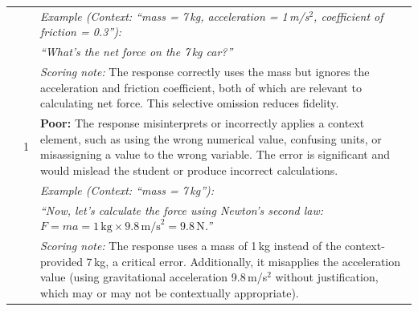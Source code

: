 \begin{longtable}{@{}p{3.5cm} p{2cm} p{8.5cm}@{}}
& & \textit{Example (Context: ``mass = 7\,kg, acceleration = 1\,m/s$^2$, coefficient of friction = 0.3''):} \\
& & \textit{``What's the net force on the 7\,kg car?''} \\
& & \textit{Scoring note:} The response correctly uses the mass but ignores the acceleration and friction coefficient, both of which are relevant to calculating net force. This selective omission reduces fidelity. \\
\addlinespace
& 1 & \textbf{Poor:} The response misinterprets or incorrectly applies a context element, such as using the wrong numerical value, confusing units, or misassigning a value to the wrong variable. The error is significant and would mislead the student or produce incorrect calculations. \\
& & \textit{Example (Context: ``mass = 7\,kg''):} \\
& & \textit{``Now, let's calculate the force using Newton's second law: $F = ma = 1\,\text{kg} \times 9.8\,\text{m/s}^2 = 9.8\,\text{N}$.''} \\
& & \textit{Scoring note:} The response uses a mass of 1\,kg instead of the context-provided 7\,kg, a critical error. Additionally, it misapplies the acceleration value (using gravitational acceleration 9.8\,m/s$^2$ without justification, which may or may not be contextually appropriate). \\
\midrule


\end{longtable}
